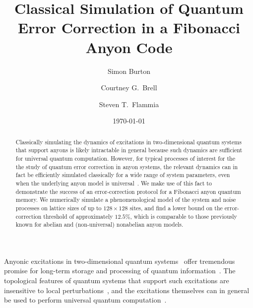 \documentclass[aps, prl, letterpaper, twocolumn, superscriptaddress, notitlepage, 10pt]{revtex4-1}
\begin{document}
\title{Classical Simulation of Quantum Error Correction in a Fibonacci Anyon Code}

\author{Simon Burton}
\author{Courtney G.\ Brell}
\author{Steven T.\ Flammia}

\date{\today}

\begin{abstract}
Classically simulating the dynamics of excitations in two-dimensional quantum systems that 
support anyons is likely intractable in general because such dynamics are sufficient for 
universal quantum computation. However, for typical processes of interest for the the study of 
quantum error correction in anyon systems, the relevant dynamics can in fact be efficiently 
simulated classically for a wide range of system parameters, even when the underlying anyon 
model is universal~\cite{RGsim}. We make use of this fact to demonstrate the success of an 
error-correction protocol for a Fibonacci anyon quantum memory. We numerically simulate a 
phenomenological model of the system and noise processes on lattice sizes of up to 
$128\times128$ sites, and find a lower bound on the error-correction threshold of 
approximately $12.5\%$, which is comparable to those previously known for abelian and 
(non-universal) nonabelian anyon models.
\end{abstract}

\maketitle


Anyonic excitations in two-dimensional quantum systems~\cite{Wilczek1990} offer 
tremendous promise for long-term storage and processing of quantum 
information~\cite{Kitaev2003}. The topological features of quantum systems that support 
such excitations are insensitive to local 
perturbations~\cite{Bravyi2010, *Bravyi2011a, *Michalakis2013}, and the excitations 
themselves can in general be used to perform universal quantum 
computation~\cite{Freedman2002, *Freedman2002b}. 
\end{document}
